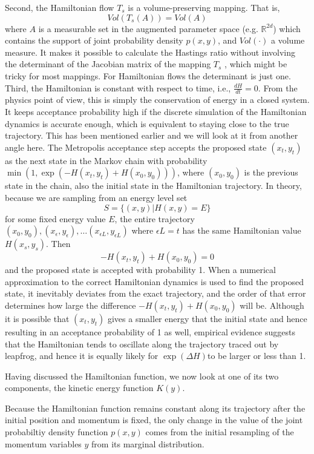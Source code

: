 \documentclass{book}
\begin{document}
\begin{enumerate}
Second, the Hamiltonian flow $T_s$ is a volume-preserving mapping. That is, 
\[ Vol(T_s(A)) = Vol(A) \]
where $A$ is a measurable set in the augmented parameter space (e.g.
$\mathbb{R}^{2d}$) which contains
the support of 
joint probability density $p(x,y)$, and $Vol(\cdot)$ a volume measure. 
It makes it
possible to calculate the Hastings ratio without involving the determinant of
the Jacobian matrix of the mapping $T_s$ , which might be tricky for most
mappings. For Hamiltonian flows the determinant is just one.
Third, the Hamiltonian is constant with respect to time, i.e., $\frac{dH}{dt} =
0$. From the physics point of view, this is simply the conservation of energy in
a closed system. It keeps acceptance probability high if the discrete simulation
of the Hamiltonian dynamics is accurate enough, which is equivalent to staying
close to the true trajectory. This has been mentioned earlier
and we will look at it from another angle here. The Metropolis acceptance step
accepts the proposed state $(x_t,y_t)$ as the next state in the Markov chain
with probability $\min(1, \exp(-H(x_t,y_t) + H(x_0,y_0)))$, where $(x_0,y_0)$ is
the previous state in the chain, also the initial state in the Hamiltonian
trajectory. In theory, because we are sampling from an energy level set 
\[ S=\{(x,y)|H(x,y)=E\} \]
for some fixed energy value $E$, the entire trajectory
$(x_0,y_0),(x_\epsilon,y_\epsilon),\dots (x_{\epsilon L},y_{\epsilon L})$ where
$\epsilon L = t $ has the same Hamiltonian value $H(x_s,y_s)$. Then 
\[ -H(x_t,y_t) + H(x_0,y_0) = 0 \]
and the proposed state is accepted with probability 1. When a numerical
approximation to the correct Hamiltonian dynamics is used to find the proposed
state, it inevitably deviates from the exact trajectory, and the order of that
error determines how large the difference $ -H(x_t,y_t) + H(x_0,y_0)$ will be.
Although it is possible that $(x_t,y_t)$ gives a smaller energy that the initial
state and hence resulting in an acceptance probability of 1 as well, empirical
evidence suggests that the Hamiltonian tends to oscillate along the trajectory
traced out by leapfrog, and hence it is equally likely for $\exp(\Delta H)$to be
larger or less than 1. 

Having discussed the Hamiltonian function, we now look at one of its two
components, the kinetic energy function $K(y)$.  

Because the
Hamiltonian function remains constant along its trajectory after the initial
position and momentum is fixed, the only change in the value of the joint probabiltiy
density function $p(x,y)$ comes from the initial resampling of the momentum variables $y$
from its marginal distribution.


\end{enumerate}
\end{document}
